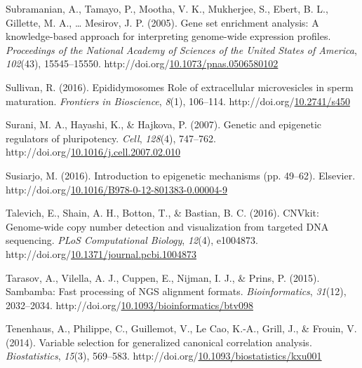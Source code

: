 \documentclass[12pt,twoside]{reedthesis}
\newlength{\cslhangindent}
\newenvironment{CSLReferences}[2] %
 {%
  \setlength{\parindent}{0pt}
  \ifodd #1 \everypar{\setlength{\hangindent}{\cslhangindent}}\ignorespaces\fi
  \ifnum #2 > 0
  \setlength{\parskip}{#2\baselineskip}
  \fi
 }%
 {}
\begin{document}
\begin{CSLReferences}{1}{0}
\leavevmode{}%
Subramanian, A., Tamayo, P., Mootha, V. K., Mukherjee, S., Ebert, B. L., Gillette, M. A., \ldots{} Mesirov, J. P. (2005). Gene set enrichment analysis: A knowledge-based approach for interpreting genome-wide expression profiles. \emph{Proceedings of the National Academy of Sciences of the United States of America}, \emph{102}(43), 15545--15550. http://doi.org/\href{https://doi.org/10.1073/pnas.0506580102}{10.1073/pnas.0506580102}

\leavevmode{}%
Sullivan, R. (2016). Epididymosomes Role of extracellular microvesicles in sperm maturation. \emph{Frontiers in Bioscience}, \emph{8}(1), 106--114. http://doi.org/\href{https://doi.org/10.2741/s450}{10.2741/s450}

\leavevmode{}%
Surani, M. A., Hayashi, K., \& Hajkova, P. (2007). Genetic and epigenetic regulators of pluripotency. \emph{Cell}, \emph{128}(4), 747--762. http://doi.org/\href{https://doi.org/10.1016/j.cell.2007.02.010}{10.1016/j.cell.2007.02.010}

\leavevmode{}%
Susiarjo, M. (2016). Introduction to epigenetic mechanisms (pp. 49--62). Elsevier. http://doi.org/\href{https://doi.org/10.1016/B978-0-12-801383-0.00004-9}{10.1016/B978-0-12-801383-0.00004-9}

\leavevmode{}%
Talevich, E., Shain, A. H., Botton, T., \& Bastian, B. C. (2016). CNVkit: Genome-wide copy number detection and visualization from targeted DNA sequencing. \emph{PLoS Computational Biology}, \emph{12}(4), e1004873. http://doi.org/\href{https://doi.org/10.1371/journal.pcbi.1004873}{10.1371/journal.pcbi.1004873}

\leavevmode{}%
Tarasov, A., Vilella, A. J., Cuppen, E., Nijman, I. J., \& Prins, P. (2015). Sambamba: Fast processing of NGS alignment formats. \emph{Bioinformatics}, \emph{31}(12), 2032--2034. http://doi.org/\href{https://doi.org/10.1093/bioinformatics/btv098}{10.1093/bioinformatics/btv098}

\leavevmode{}%
Tenenhaus, A., Philippe, C., Guillemot, V., Le Cao, K.-A., Grill, J., \& Frouin, V. (2014). Variable selection for generalized canonical correlation analysis. \emph{Biostatistics}, \emph{15}(3), 569--583. http://doi.org/\href{https://doi.org/10.1093/biostatistics/kxu001}{10.1093/biostatistics/kxu001}


\end{CSLReferences}
\end{document}
